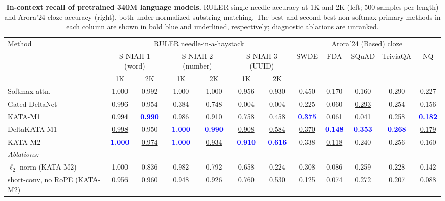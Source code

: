 \documentclass{article}
\newcommand{\1}{\bm{1}}
\theoremstyle{definition}
\begin{document}
\begin{table}[t]
  \centering
  \fontsize{7.7pt}{9.2pt}\selectfont
  \setlength{\tabcolsep}{2.2pt}
  \begin{tabular}{l|cc|cc|cc|ccccc}
    \toprule
    \multirow{3}{*}{Method}
      & \multicolumn{6}{c|}{RULER needle-in-a-haystack}
      & \multicolumn{5}{c}{Arora'24 (Based) cloze} \\
    \cmidrule(lr){2-7}\cmidrule(lr){8-12}
      & \multicolumn{2}{c|}{S-NIAH-1 (word)}
      & \multicolumn{2}{c|}{S-NIAH-2 (number)}
      & \multicolumn{2}{c|}{S-NIAH-3 (UUID)}
      & \multirow{2}{*}{SWDE}
      & \multirow{2}{*}{FDA}
      & \multirow{2}{*}{SQuAD}
      & \multirow{2}{*}{TriviaQA}
      & \multirow{2}{*}{NQ} \\
    \cmidrule(lr){2-3}\cmidrule(lr){4-5}\cmidrule(lr){6-7}
      & 1K & 2K & 1K & 2K & 1K & 2K & & & & & \\
    \midrule
    Softmax attn.
      & 1.000 & 0.992 & 1.000 & 1.000 & 0.956 & 0.930
      & 0.450 & 0.170 & 0.160
      & 0.290 & 0.227 \\
    \midrule
    Gated DeltaNet
      & 0.996 & 0.954 & 0.384 & 0.748 & 0.004 & 0.004
      & 0.225 & 0.060 & \underline{0.293} & 0.254 & 0.156 \\
    \midrule
    KATA-M1
      & 0.994 & \textcolor{blue}{\textbf{0.990}} & \underline{0.986} & 0.910 & 0.758 & 0.458
      & \textcolor{blue}{\textbf{0.375}} & 0.061 & 0.041 & \underline{0.258} & \textcolor{blue}{\textbf{0.182}} \\
    DeltaKATA-M1
      & \underline{0.998} & 0.950 & \textcolor{blue}{\textbf{1.000}}
      & \textcolor{blue}{\textbf{0.990}} & \underline{0.908} & \underline{0.584}
      & \underline{0.370} & \textcolor{blue}{\textbf{0.148}} & \textcolor{blue}{\textbf{0.353}}
      & \textcolor{blue}{\textbf{0.268}} & \underline{0.179} \\
    KATA-M2
      & \textcolor{blue}{\textbf{1.000}} & \underline{0.974}
      & \textcolor{blue}{\textbf{1.000}} & \underline{0.934}
      & \textcolor{blue}{\textbf{0.910}} & \textcolor{blue}{\textbf{0.616}}
      & 0.338 & \underline{0.118} & 0.240 & 0.256 & 0.160 \\
    \addlinespace[1pt]
    \emph{Ablations:} & & & & & & & & & & & \\
    \quad $\ell_2$-norm (KATA-M2)
      & 1.000 & 0.836 & 0.982 & 0.792 & 0.658 & 0.224
      & 0.308 & 0.086 & 0.259 & 0.228 & 0.142 \\
    \quad short-conv, no RoPE (KATA-M2)
      & 0.956 & 0.960 & 0.948 & 0.926 & 0.760 & 0.530
      & 0.125 & 0.074 & 0.272 & 0.207 & 0.088 \\
    \bottomrule
  \end{tabular}
  \caption{\textbf{In-context recall of pretrained 340M language models.}
  RULER single-needle accuracy at 1K and 2K (left; 500 samples per length) and
  Arora'24 cloze accuracy (right), both under normalized substring matching.
  The best and second-best non-softmax primary methods in each column are shown in
  bold blue and underlined, respectively; diagnostic ablations are unranked.}
  \label{tab:niah}
  \label{tab:qa}
\end{table}
\end{document}
